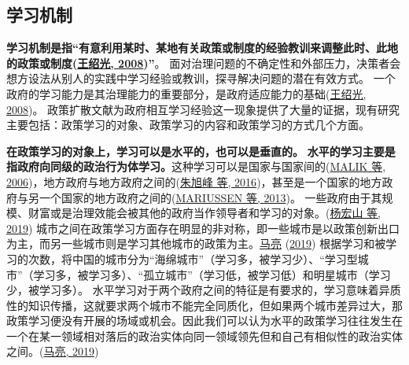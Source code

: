 \documentclass[
  12pt,
]{ctexart}
\begin{document}
\hypertarget{ux5b66ux4e60ux673aux5236}{%
\subsection{学习机制}\label{ux5b66ux4e60ux673aux5236}}

\textbf{学习机制是指``有意利用某时、某地有关政策或制度的经验教训来调整此时、此地的政策或制度(\protect\hyperlink{ref-WangShaoGuang2008a}{王绍光, 2008})''}。
面对治理问题的不确定性和外部压力，决策者会想方设法从别人的实践中学习经验或教训，探寻解决问题的潜在有效方式。
一个政府的学习能力是其治理能力的重要部分，是政府适应能力的基础(\protect\hyperlink{ref-WangShaoGuang2008a}{王绍光, 2008})。
政策扩散文献为政府相互学习经验这一现象提供了大量的证据，现有研究主要包括：政策学习的对象、政策学习的内容和政策学习的方式几个方面。

\textbf{在政策学习的对象上，学习可以是水平的，也可以是垂直的。}
\textbf{水平的学习主要是指政府向同级的政治行为体学习。}这种学习可以是国家与国家间的(\protect\hyperlink{ref-MalikCunningham2006}{MALIK 等, 2006})，地方政府与地方政府之间的(\protect\hyperlink{ref-ZhuXuFengZhaoHui2016}{朱旭峰 等, 2016})，甚至是一个国家的地方政府与另一个国家的地方政府之间的(\protect\hyperlink{ref-MariussenVirkkala2013}{MARIUSSEN 等, 2013})。
一些政府由于其规模、财富或是治理效能会被其他的政府当作领导者和学习的对象。(\protect\hyperlink{ref-YangHongShanLiPing2019}{杨宏山 等, 2019})
城市之间在政策学习方面存在明显的非对称，即一些城市是以政策创新出口为主，而另一些城市则是学习其他城市的政策为主。\protect\hyperlink{ref-MaLiang2019}{马亮} (\protect\hyperlink{ref-MaLiang2019}{2019}) 根据学习和被学习的次数，将中国的城市分为``海绵城市''（学习多，被学习少）、``学习型城市''（学习多，被学习多）、``孤立城市''（学习低，被学习低）和明星城市（学习少，被学习多）。
水平学习对于两个政府之间的特征是有要求的，学习意味着异质性的知识传播，这就要求两个城市不能完全同质化，但如果两个城市差异过大，那政策学习便没有开展的场域或机会。因此我们可以认为水平的政策学习往往发生在一个在某一领域相对落后的政治实体向同一领域领先但和自己有相似性的政治实体之间。(\protect\hyperlink{ref-MaLiang2019}{马亮, 2019})
\end{document}
